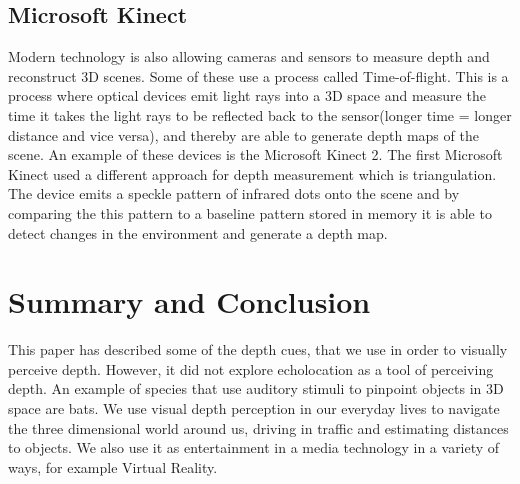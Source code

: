 	\subsection{Microsoft Kinect}
	Modern technology is also allowing cameras and sensors to measure depth and reconstruct 3D scenes. Some of these use a process called Time-of-flight. This is a process where optical devices emit light rays into a 3D space and measure the time it takes the light rays to be reflected back to the sensor(longer time = longer distance and vice versa), and thereby are able to generate depth maps of the scene. An example of these devices is the Microsoft Kinect 2\citep{tof}. The first Microsoft Kinect used a different approach for depth measurement which is triangulation. The device emits a speckle pattern of infrared dots onto the scene and by comparing the this pattern to a baseline pattern stored in memory it is able to detect changes in the environment and generate a depth map\citep{pointCloud}.
	

\section{Summary and Conclusion}
This paper has described some of the depth cues, that we use in order to visually perceive depth. However, it did not explore echolocation as a tool of perceiving depth. An example of species that use auditory stimuli to pinpoint objects in 3D space are bats\citep[p.~381]{sensationPerception}. We use visual depth perception in our everyday lives to navigate the three dimensional world around us, driving in traffic and estimating distances to objects. We also use it as entertainment in a media technology in a variety of ways, for example Virtual Reality.

